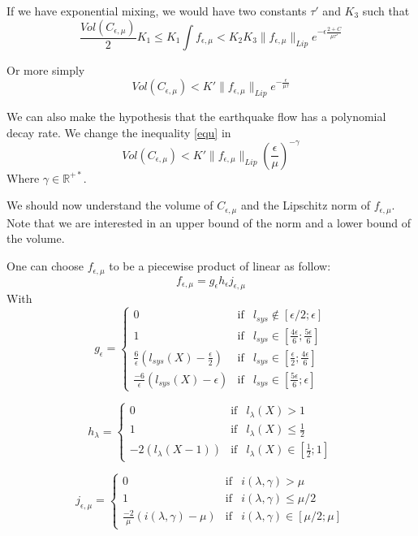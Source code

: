 If we have exponential mixing, we would have two constants $\tau'$ and $K_3$ such that \[
\frac{Vol(C_{\epsilon,\mu})}{2}K_1 \leq K_1 \int f_{\epsilon,\mu}
< K_2 K_3 \| f_{\epsilon,\mu} \|_{Lip} e^{-\epsilon \frac{2+C}{\mu \tau'}}
\]

Or more simply \begin{equation}
Vol(C_{\epsilon,\mu}) < K' \| f_{\epsilon,\mu} \|_{Lip} e^{-\frac{\epsilon}{\mu \tau}}
\label{equ}
\end{equation}


We can also make the hypothesis that the earthquake flow has a polynomial decay rate. We change the inequality \ref{equ} in
\begin{equation}
Vol(C_{\epsilon,\mu}) < K' \| f_{\epsilon,\mu} \|_{Lip} \left(\frac{\epsilon}{\mu}\right)^{-\gamma}
\label{poly}
\end{equation}
Where $\gamma \in \mathbb{R^{+*}}$.

We should now understand the volume of $C_{\epsilon,\mu}$ and the Lipschitz norm of $f_{\epsilon,\mu}$. Note that we are interested in an upper bound of the norm and a lower bound of the volume.


One can choose $f_{\epsilon,\mu}$ to be a piecewise product of linear as follow:\[
f_{\epsilon,\mu}=g_{\epsilon}h_{\epsilon}j_{\epsilon,\mu}
\]
With
$$
g_{\epsilon} = \left \{
\begin{array}{lll}
0 & \text{if} & l_{sys} \notin [\epsilon/2;\epsilon]\\
1 & \text{if} & l_{sys} \in [\frac{4 \epsilon}{6};\frac{5 \epsilon}{6}]\\
\frac{6}{\epsilon}(l_{sys}(X)-\frac{\epsilon}{2}) & \text{if} & l_{sys} \in [\frac{\epsilon}{2};\frac{4 \epsilon}{6}]\\
\frac{-6}{\epsilon}(l_{sys}(X)-\epsilon) & \text{if} & l_{sys} \in [\frac{5 \epsilon}{6};\epsilon]
\end{array}
\right .
$$

$$
h_{\lambda} = \left \{
\begin{array}{lll}
0 & \text{if} & l_{\lambda}(X) > 1\\
1 & \text{if} & l_{\lambda}(X) \leq \frac{1}{2}\\
-2(l_\lambda(X -1)) & \text{if} & l_{\lambda}(X) \in [\frac{1}{2};1]
\end{array}
\right .
$$

$$
j_{\epsilon,\mu} = \left \{
\begin{array}{lll}
0 & \text{if} & i(\lambda,\gamma) > \mu\\
1 & \text{if} & i(\lambda,\gamma) \leq \mu/2\\
\frac{-2 }{\mu}(i(\lambda,\gamma)-\mu) & \text{if} & i(\lambda,\gamma) \in [\mu/2; \mu]
\end{array}
\right .
$$

